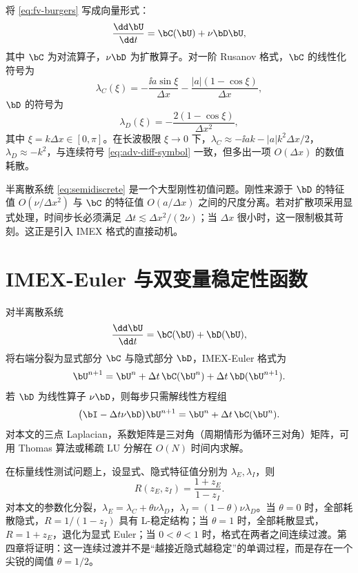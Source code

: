 将 \eqref{eq:fv-burgers} 写成向量形式：
\begin{equation}
  \frac{\dd \bU}{\dd t}=\bC(\bU)+\nu\bD\bU,
  \label{eq:semidiscrete}
\end{equation}
其中 $\bC$ 为对流算子，$\nu\bD$ 为扩散算子。对一阶 Rusanov 格式，$\bC$ 的线性化符号为
\begin{equation}
  \lambda_C(\xi)=-\frac{\ii a\sin\xi}{\Delta x}
  -\frac{|a|(1-\cos\xi)}{\Delta x},
  \label{eq:lambda-C}
\end{equation}
$\bD$ 的符号为
\begin{equation}
  \lambda_D(\xi)=-\frac{2(1-\cos\xi)}{\Delta x^2},
  \label{eq:lambda-D}
\end{equation}
其中 $\xi=k\Delta x\in[0,\pi]$。在长波极限 $\xi\to0$ 下，$\lambda_C\approx-\ii ak-|a|k^2\Delta x/2$，$\lambda_D\approx-k^2$，与连续符号 \eqref{eq:adv-diff-symbol} 一致，但多出一项 $O(\Delta x)$ 的数值耗散。

半离散系统 \eqref{eq:semidiscrete} 是一个大型刚性初值问题。刚性来源于 $\bD$ 的特征值 $O(\nu/\Delta x^2)$ 与 $\bC$ 的特征值 $O(a/\Delta x)$ 之间的尺度分离。若对扩散项采用显式处理，时间步长必须满足 $\Delta t\lesssim\Delta x^2/(2\nu)$；当 $\Delta x$ 很小时，这一限制极其苛刻。这正是引入 IMEX 格式的直接动机。

\section{IMEX-Euler 与双变量稳定性函数}
\label{sec:imex-basic}

对半离散系统
\begin{equation}
  \frac{\dd \bU}{\dd t}=\bC(\bU)+\bD(\bU),
\end{equation}
将右端分裂为显式部分 $\bC$ 与隐式部分 $\bD$，IMEX-Euler 格式为
\begin{equation}
  \bU^{n+1}=\bU^n+\Delta t\,\bC(\bU^n)+\Delta t\,\bD(\bU^{n+1}).
  \label{eq:imex-euler-general}
\end{equation}
若 $\bD$ 为线性算子 $\nu\bD$，则每步只需解线性方程组
\begin{equation}
  \bigl(\bI-\Delta t\nu\bD\bigr)\bU^{n+1}
  =\bU^n+\Delta t\,\bC(\bU^n).
  \label{eq:imex-linear-solve}
\end{equation}
对本文的三点 Laplacian，系数矩阵是三对角（周期情形为循环三对角）矩阵，可用 Thomas 算法或稀疏 LU 分解在 $O(N)$ 时间内求解。

在标量线性测试问题上，设显式、隐式特征值分别为 $\lambda_E,\lambda_I$，则
\begin{equation}
  R(z_E,z_I)=\frac{1+z_E}{1-z_I}.
\end{equation}
对本文的参数化分裂，$\lambda_E=\lambda_C+\theta\nu\lambda_D$，$\lambda_I=(1-\theta)\nu\lambda_D$。当 $\theta=0$ 时，全部耗散隐式，$R=1/(1-z_I)$ 具有 L-稳定结构；当 $\theta=1$ 时，全部耗散显式，$R=1+z_E$，退化为显式 Euler；当 $0<\theta<1$ 时，格式在两者之间连续过渡。第四章将证明：这一连续过渡并不是“越接近隐式越稳定”的单调过程，而是存在一个尖锐的阈值 $\theta=1/2$。


